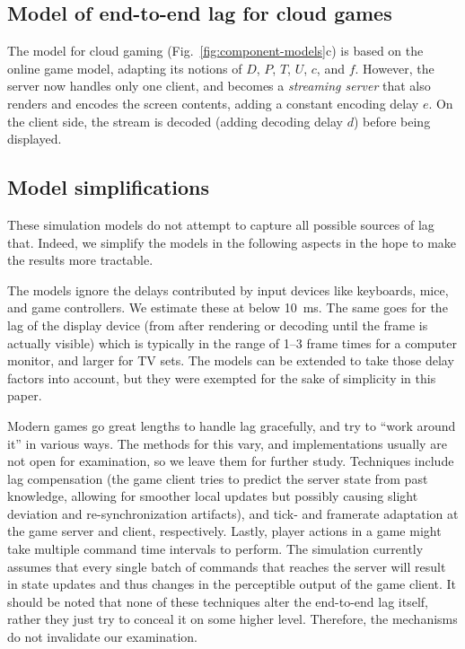 \subsection{Model of end-to-end lag for cloud games}
The model for cloud gaming (Fig.~\ref{fig:component-models}c) 
is based on the online game model, adapting its notions of 
$D$, $P$, $T$, $U$, $c$, and $f$. However, the server now handles 
only one client, and becomes a \textit{streaming server} that also 
renders and encodes the screen contents, adding a constant encoding 
delay $e$. On the client side, the stream is decoded (adding decoding 
delay $d$) before being displayed.



\subsection{Model simplifications}

These simulation models do not attempt to capture all possible 
sources of lag that. Indeed, we simplify the models in the 
following aspects in the hope to make the results more tractable.

The models ignore the delays contributed by 
input devices like keyboards, mice, and game controllers. We estimate 
these at below \SI{10}{\milli\second}. The same goes for the lag of 
the display device (from after rendering or decoding until the frame 
is actually visible) which is typically in the range of 1--3 
frame times for a computer 
monitor, and larger for TV sets. The models can be extended to take those delay factors into account, but they were exempted for the sake of simplicity in this paper.

Modern games go great lengths 
to handle lag gracefully, and try to ``work around it'' in various ways. 
The methods for this vary, and implementations usually are not open 
for examination, so we leave them for further study. 
Techniques include lag compensation (the game client 
tries to predict the server state from past knowledge, allowing for 
smoother local updates but possibly causing slight deviation and 
re-synchronization artifacts), and tick- and framerate adaptation 
at the game server and client, respectively.
Lastly, player actions in a game might take multiple command time 
intervals to perform. The simulation currently assumes that every 
single batch of commands that reaches the server will result in 
state updates and thus changes in the perceptible output of the game 
client. It should be noted that none of these techniques alter the 
end-to-end lag itself, rather they just try to conceal it on some higher level. 
Therefore, the mechanisms do not invalidate our examination.

